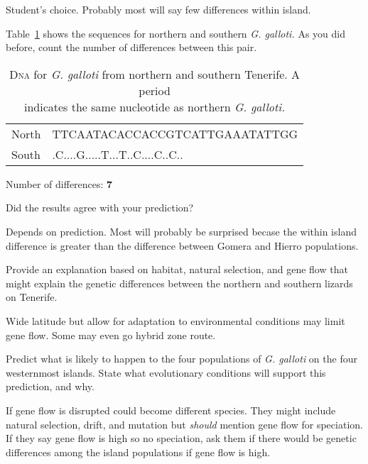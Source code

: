 \documentclass[12pt, hidelinks]{exam}
\newcommand*\AnswerBox[2]{%
    \parbox[t][#1]{0.92\textwidth}{%
    \begin{solution}#2\end{solution}}
    \vspace{\stretch{1}}
}
\begin{document}
\begin{questions}
\AnswerBox{2\baselineskip}{Student's choice. Probably most will say few differences within island.}

\question
Table~\ref{tab:galloti} shows the sequences for northern and southern \textit{G. galloti.} As you did before, count the number of differences between this pair.

{\dnatable
\begin{longtable}[l]{ll}
\caption{D\textsc{na} for \textit{G. galloti} from northern and southern Tenerife. A period \\indicates the same nucleotide as northern \textit{G. galloti.}\label{tab:galloti}}\tabularnewline
\toprule
{\regfont North} & TTCAATACACCACCGTCATTGAAATATTGG \tabularnewline
{\regfont South} & .C....G.....T...T..C....C..C.. \tabularnewline
\bottomrule
\end{longtable}
}

Number of differences: \ifprintanswers \textbf{7} \fi

\vspace{\baselineskip}

\question
Did the results agree with your prediction? 

\AnswerBox{2\baselineskip}{Depends on prediction. Most will probably be surprised becase the within island difference is greater than the difference between Gomera and Hierro populations.}

\question[Checkout]
Provide an explanation based on habitat, natural selection, and gene flow that might explain the genetic differences between the northern and southern lizards on Tenerife.

\AnswerBox{3\baselineskip}{Wide latitude but allow for adaptation to environmental conditions may limit gene flow. Some may even go hybrid zone route.}

\question[Checkout]
Predict what is likely to happen to the four populations of \textit{G. galloti} on the four westernmost islands. State what evolutionary conditions will support this prediction, and why.

\AnswerBox{3\baselineskip}{If gene flow is disrupted could become different species. They might include natural selection, drift, and mutation but \emph{should} mention gene flow for speciation. If they say gene flow is high so no speciation, ask them if there would be genetic differences among the island populations if gene flow is high.}



\end{questions}
\end{document}
